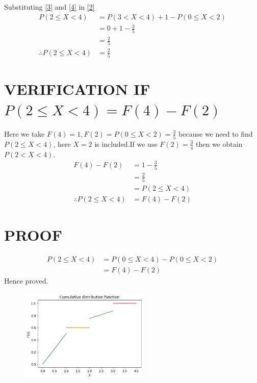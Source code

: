 \documentclass[journal,12pt,twocolumn]{IEEEtran}
\begin{document}
Substituting \eqref{3} and \eqref{4} in \eqref{2}
\begin{align}
P(2 \leq X <4) &=  P(3<X<4) + 1  - P(0 \leq X <2)\\
&= 0+1- \frac{3}{5}\\
&=\frac{2}{5}\\
\therefore P(2 \leq X <4) &= \frac{2}{5}
\end{align}

\section*{VERIFICATION IF $P(2 \leq X <4)=F(4)-F(2)$ }
Here we take $F(4)=1,F(2)=P(0 \leq X <2)=\frac{3}{5}$ because we need to find $P(2 \leq X <4)$, here $X=2$ is included.If we use $F(2)=\frac{3}{4}$ then we obtain $P(2 < X <4)$.
\begin{align}
F(4)-F(2) &= 1 - \frac{3}{5}\\
&= \frac{2}{5}\\
&= P(2 \leq X <4)\\
\therefore P(2 \leq X <4)&=F(4)-F(2) 
\end{align}
\section*{PROOF}
\begin{align}
P(2 \leq X <4)&= P(0 \leq X <4)-P(0 \leq X <2)\\
&=F(4)-F(2)
\end{align}
Hence proved.



\begin{figure}[htb!]
\includegraphics[width=0.55\textwidth]{assignment2.png}
\end{figure}
\end{document}
